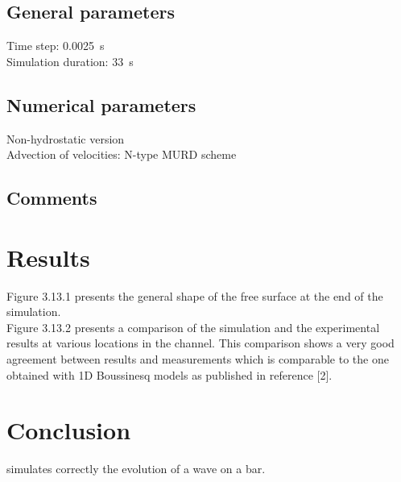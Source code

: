 \subsection{General parameters}
%
Time step: 0.0025~s\\
Simulation duration: 33~s
%
%
%
\subsection{Numerical parameters}
%
Non-hydrostatic version\\
Advection of velocities: N-type MURD scheme
%
\subsection{Comments}
%
%
%
\section{Results}
%
Figure 3.13.1 presents the general shape of the free surface at the end
of the simulation.\\
Figure 3.13.2 presents a comparison of the \tel simulation and the
experimental results at various locations in the channel.
This comparison shows a very good agreement between results and
measurements which is comparable to the one obtained with 1D Boussinesq
models as published in reference [2].
%
\section{Conclusion}
%
 simulates correctly the evolution of a wave on a bar.
%
%
